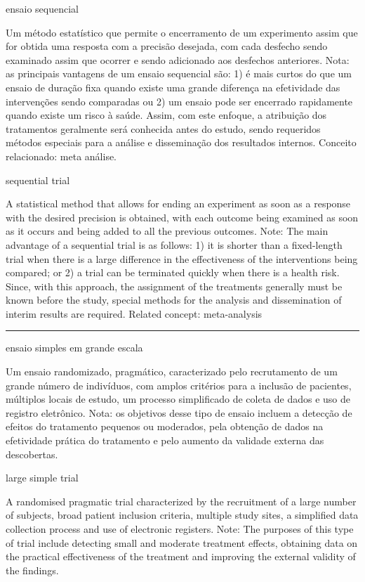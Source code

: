 \documentclass[
]{book}
\begin{document}
ensaio sequencial

Um método estatístico que permite o encerramento de um experimento assim que for obtida uma resposta com a precisão desejada, com cada desfecho sendo examinado assim que ocorrer e sendo adicionado aos desfechos anteriores. Nota: as principais vantagens de um ensaio sequencial são: 1) é mais curtos do que um ensaio de duração fixa quando existe uma grande diferença na efetividade das intervenções sendo comparadas ou 2) um ensaio pode ser encerrado rapidamente quando existe um risco à saúde. Assim, com este enfoque, a atribuição dos tratamentos geralmente será conhecida antes do estudo, sendo requeridos métodos especiais para a análise e disseminação dos resultados internos. Conceito relacionado: meta análise.

sequential trial

A statistical method that allows for ending an experiment as soon as a response with the desired precision is obtained, with each outcome being examined as soon as it occurs and being added to all the previous outcomes. Note: The main advantage of a sequential trial is as follows: 1) it is shorter than a fixed-length trial when there is a large difference in the effectiveness of the interventions being compared; or 2) a trial can be terminated quickly when there is a health risk. Since, with this approach, the assignment of the treatments generally must be known before the study, special methods for the analysis and dissemination of interim results are required. Related concept: meta-analysis

\begin{center}\rule{0.5\linewidth}{0.5pt}\end{center}

ensaio simples em grande escala

Um ensaio randomizado, pragmático, caracterizado pelo recrutamento de um grande número de indivíduos, com amplos critérios para a inclusão de pacientes, múltiplos locais de estudo, um processo simplificado de coleta de dados e uso de registro eletrônico. Nota: os objetivos desse tipo de ensaio incluem a detecção de efeitos do tratamento pequenos ou moderados, pela obtenção de dados na efetividade prática do tratamento e pelo aumento da validade externa das descobertas.

large simple trial

A randomised pragmatic trial characterized by the recruitment of a large number of subjects, broad patient inclusion criteria, multiple study sites, a simplified data collection process and use of electronic registers. Note: The purposes of this type of trial include detecting small and moderate treatment effects, obtaining data on the practical effectiveness of the treatment and improving the external validity of the findings.
\end{document}

